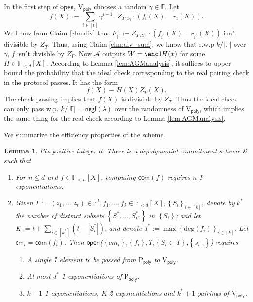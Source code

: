 \documentclass[11pt]{article} %
\newcommand{\F}{\ensuremath{\mathbb F}\xspace}
\newcommand{\adv}{\ensuremath{\mathcal A}\xspace}
\newcommand{\com}{\ensuremath{\mathsf{com}}\xspace}
\newcommand{\cm}{\ensuremath{\mathsf{cm}}\xspace}
\newcommand{\open}{\ensuremath{\mathsf{open}}\xspace}
\renewcommand{\deg}{\ensuremath{\mathrm{deg}}\xspace}
\newcommand{\negl}{\ensuremath{\mathsf{negl}(\lambda)}\xspace}
\newcommand{\defeq}{:=}
\newcommand{\sett}[2]{\ensuremath{\set{#1}_{#2}}\xspace}
\newcommand{\prvpoly}{\ensuremath{\mathrm{P_{\mathsf{poly}}}}\xspace}
\newcommand{\verpoly}{\ensuremath{\mathrm{V_{\mathsf{poly}}}}\xspace}
\newcommand{\set}[1]{\ensuremath{\left\{#1\right\}}\xspace}
\newcommand{\polysofdeg}[1]{\ensuremath{\F_{< #1}[X]}\xspace}
\newcommand{\PCscheme}{\ensuremath{\mathscr{S}}\xspace}
\newcommand{\sumi}[1]{\sum_{i\in[#1]}}
\newtheorem{lemma}{Lemma}[section]
\begin{document}
\begin{enumerate}
 In the first step of \open, \verpoly chooses a random $\gamma \in \F$.
 Let
 \[f(X)\defeq \sum_{i\in [t]} \gamma^{i-1} \cdot Z_{T\setminus S_i}\cdot (f_i(X)-r_i(X)).\]
 We know from Claim \ref{clm:div} that $F_{i^*} \defeq  Z_{T\setminus S_{i^*}}\cdot (f_{i^*}(X)-r_{i^*}(X))$ isn't divisible by $Z_T$. Thus, using Claim \ref{clm:div_sum}, we know that e.w.p $k/|\F|$ over $\gamma$, $f$ isn't divisble by $Z_T$.
  Now \adv outputs $W=\enc1{H(x)}$ for some $H\in\polysofdeg{d}$.
 According to Lemma \ref{lem:AGManalysis}, it suffices to upper bound the probability that the ideal check corresponding to the real pairing check in the protocol passes. It has the form
 \[f(X) \equiv H(X)Z_T(X).\]
 The check passing implies that
 $f(X)$ is divisible by $Z_T$. Thus the ideal check can only pass w.p. $k/|\F|= \negl$ over the randomness of \verpoly, which implies the same thing for the real check according to Lemma \ref{lem:AGManalysis}.
 
 
 \end{enumerate}

 
 
 We summarize the efficiency properties of the scheme.
 
 \begin{lemma}\label{lem:multikate}
 Fix positive integer $d$.
  There is a $d$-polynomial commitment scheme \PCscheme such that
  \begin{enumerate}
   \item For $n\leq d$ and $f\in \polysofdeg{n}$, computing $\com(f)$ requires $n$ \G1-exponentiations.
   \item Given $T \defeq (z_1,\ldots,z_t)\in \F^t, f_1,\ldots, f_k \in \polysofdeg{d}, \sett{S_i}{i\in [k]}$, denote by $k^*$ the number of distinct subsets  \set{S^*_1,\ldots,S^*_{k^*}} in \set{S_i}; and 
   let $K\defeq t+ \sumi {k^*}\left( t-|S^*_i|\right)$.
   and denote $d^* \defeq \max\sett{\deg(f_i)}{i\in [k]}$.
   Let $\cm_i = \com(f_i)$.
   Then \open(\set{cm_i},\set{f_i},T,\set{S_i\subset T},\set{s_{i,z}})  requires
   \begin{enumerate}
   \item A single \G1 element to be passed from \prvpoly to \verpoly.
    \item At most $d^*$ \G1-exponentiations of \prvpoly.
    \item $k-1$ \G1-exponentiations, $K$ \G2-exponentiations  and $k^*+1$ pairings of \verpoly.
    \end{enumerate}
\end{enumerate}

 \end{lemma}
\end{document}
